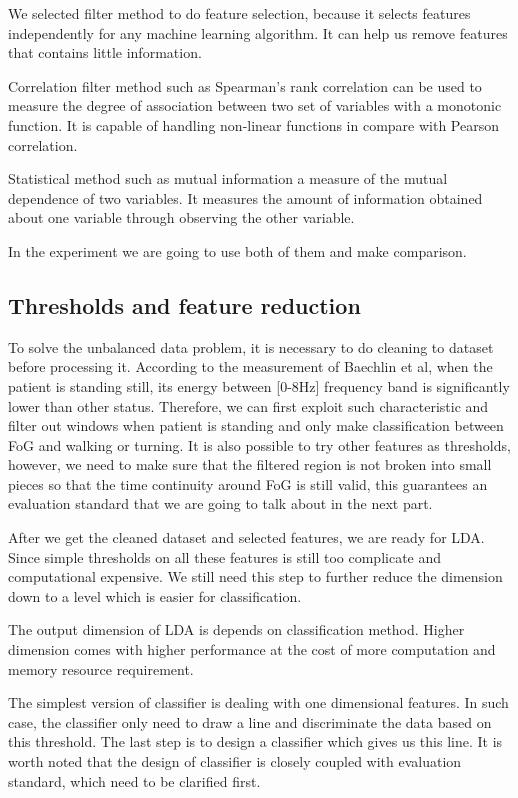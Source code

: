 \documentclass[article]{article}
\begin{document}
We selected filter method to do feature selection, because it selects features independently for any machine learning algorithm. It can help us remove features that contains little information.

Correlation filter method such as Spearman's rank correlation can be used to measure the degree of association between two set of variables with a monotonic function. It is capable of handling non-linear functions in compare with Pearson correlation.

Statistical method such as mutual information a measure of the mutual dependence of two variables. It measures the amount of information obtained about one variable through observing the other variable. 

In the experiment we are going to use both of them and make comparison.

\begin{center}
	\subsection{Thresholds and feature reduction}
\end{center}

To solve the unbalanced data problem, it is necessary to do cleaning to dataset before processing it. According to the measurement of Baechlin et al, when the patient is standing still, its energy between [0-8Hz] frequency band is significantly lower than other status. Therefore, we can first exploit such characteristic and filter out windows when patient is standing and only make classification between FoG and walking or turning. It is also possible to try other features as thresholds, however, we need to make sure that the filtered region is not broken into small pieces so that the time continuity around FoG is still valid, this guarantees an evaluation standard that we are going to talk about in the next part.

After we get the cleaned dataset and selected features, we are ready for LDA. Since simple thresholds on all these features is still too complicate and computational expensive. We still need this step to further reduce the dimension down to a level which is easier for classification.

The output dimension of LDA is depends on classification method. Higher dimension comes with higher performance at the cost of more computation and memory resource requirement.

The simplest version of classifier is dealing with one dimensional features. In such case, the classifier only need to draw a line and discriminate the data based on this threshold. The last step is to design a classifier which gives us this line. It is worth noted that the design of classifier is closely coupled with evaluation standard, which need to be clarified first.
\end{document}
